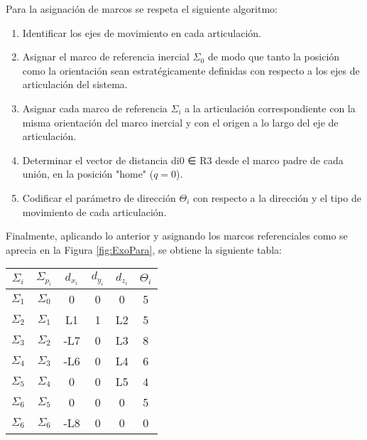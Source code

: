\documentclass[journal]{IEEEtran}
\begin{document}
    Para la asignación de marcos se respeta el siguiente algoritmo:
    \begin{enumerate}
    \item Identificar los ejes de movimiento en cada articulación.
    \item Asignar el marco de referencia inercial $\Sigma_0$ de modo que tanto la posición como la orientación sean
    estratégicamente definidas con respecto a los ejes de articulación del sistema.
    \item Asignar cada marco de referencia $\Sigma_i$ a la articulación correspondiente con la misma orientación del
    marco inercial y con el origen a lo largo del eje de articulación.
    \item Determinar el vector de distancia di0 ∈ R3 desde el marco padre de cada unión, en la posición "home" ($q = 0$).
    \item Codificar el parámetro de dirección $\Theta _i$ con respecto a la dirección y el tipo de movimiento de cada
    articulación.
    
    \end{enumerate}

    \noindent Finalmente, aplicando lo anterior y asignando los marcos referenciales como se aprecia en la Figura
    \ref{fig:ExoPara}, se obtiene la siguiente tabla:

    \begin{table}[!ht] %
    \centering
    \begin{center}
    \begin{tabular}{cccccc}
    $\Sigma_i$ & $\Sigma_{p_i}$ & $d_{x_i}$ & $d_{y_i}$ & $d_{z_i}$ & $\Theta_i$\\
    \hline \hline 
    $\Sigma_1$ & $\Sigma_0$ & 0   & 0 & 0  & 5\\ 
    $\Sigma_2$ & $\Sigma_1$ & L1  & 1 & L2 & 5\\
    $\Sigma_3$ & $\Sigma_2$ & -L7 & 0 & L3 & 8\\
    $\Sigma_4$ & $\Sigma_3$ & -L6 & 0 & L4 & 6\\
    $\Sigma_5$ & $\Sigma_4$ & 0   & 0 & L5 & 4\\
    $\Sigma_6$ & $\Sigma_5$ & 0   & 0 & 0  & 5\\
    $\Sigma_6$ & $\Sigma_6$ & -L8 & 0 & 0  & 0\\
    \end{tabular}
    \end{center}
    \end{table}
\end{document}

